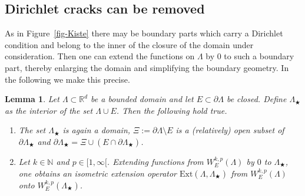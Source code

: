 \documentclass[10pt,leqno]{amsart}
\newtheorem{lemma}[theorem]{Lemma}
\theoremstyle{definition}
\numberwithin{equation}{section}
\begin{document}
\subsection{Dirichlet cracks can be removed} \label{subsec: Removing cracks}
As in Figure~\ref{fig-Kiste} there may be boundary parts which carry a
Dirichlet condition and belong to the inner of the closure of the domain under
consideration. Then one can extend the functions on $\Lambda$ by $0$ to such a
boundary part, thereby enlarging the domain and simplifying the boundary
geometry. In the following we make this precise. 

\begin{lemma} \label{l-modigeb}
 Let $\Lambda \subset {{\mathbb R}}^d$ be a bounded domain and let $E \subset \partial
 \Lambda$ be closed. Define $\Lambda_\bigstar$ as the interior of the
 set $\Lambda \cup E$.
 Then the following hold true.
 \begin{enumerate} 
  \item The set $\Lambda_\bigstar$ is again a domain, $\Xi := \partial \Lambda
	\setminus E$ is a (relatively) open subset of $\partial
\Lambda_\bigstar$
	and $\partial \Lambda_\bigstar = \Xi \cup (E \cap \partial
	\Lambda_\bigstar)$.
 \item  Let $k \in {{\mathbb N}}$ and $p \in {[1,\infty[}$. Extending functions from
$W^{k,p}_E(\Lambda)$ by $0$ to $\Lambda_\bigstar$,
	one obtains an isometric extension operator
	$\mathrm{Ext}(\Lambda,\Lambda_\bigstar)$ from $W^{k,p}_E(\Lambda)$ onto
	$W^{k,p}_E(\Lambda_\bigstar)$.
 \end{enumerate}
\end{lemma} 
\end{document}
